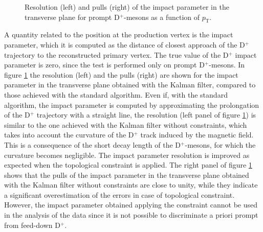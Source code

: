 \documentclass[b5paper,10pt,twoside,oldstyle,classica]{toptesi}
\newcommand{\pt}{p_\text{T}}
\begin{document}
\begin{figure}[b]
\begin{center}
\caption{Resolution (left) and pulls (right) of the impact parameter in the transverse plane for prompt D$^+$-mesons as a function of $\pt$.}
\label{KF_imppar}
\end{center}
\end{figure} A quantity related to the position at the production vertex is the impact parameter, which it is computed as the distance of closest approach of the D$^+$ trajectory to the reconstructed primary vertex. The true value of the D$^+$ impact parameter is zero, since the test is performed only on prompt D$^+$-mesons. In figure \ref{KF_imppar} the resolution (left) and the pulls (right) are shown for the impact parameter in the transverse plane obtained with the Kalman filter, compared to those achieved with the standard algorithm. Even if, with the standard algorithm, the impact parameter is computed by approximating the prolongation of the D$^+$ trajectory with a straight line, the resolution (left panel of figure \ref{KF_imppar}) is similar to the one achieved with the Kalman filter without constraints, which takes into account the curvature of the D$^+$ track induced by the magnetic field. This is a consequence of the short decay length of the D$^+$-mesons, for which the curvature becomes negligible. The impact parameter resolution is improved as expected when the topological constraint is applied. The right panel of figure \ref{KF_imppar} shows that the pulls of the impact parameter in the transverse plane obtained with the Kalman filter without constraints are close to unity, while they indicate a significant overestimation of the errors in case of topological constraint. However, the impact parameter obtained applying the constraint cannot be used in the analysis of the data since it is not possible to discriminate a priori prompt from feed-down D$^+$.       
\end{document}
